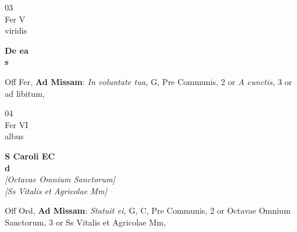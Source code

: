 \documentclass[10pt, openany]{book}
\begin{document}
        \begin{center}
            \begin{minipage}{3.5in}
                \vspace{2em}
                \begin{minipage}{0.5in}
                    {\Huge 03} \\
                    {\normalsize Fer V} \\
                    {\normalsize viridis}
                \end{minipage}
                \begin{minipage}{3.0in}
                    \textbf{ \large De ea \\
                    \textnormal{\normalsize s}} \\ 
                \end{minipage}
                \begin{justify}Off Fer, \textbf{Ad Missam}: \textit{In voluntate tua,} G, Pre Communis, 2 or \textit{A cunctis,} 3 or ad libitum,  
                \end{justify}
            \end{minipage}
        \end{center}
    
        \begin{center}
            \begin{minipage}{3.5in}
                \vspace{2em}
                \begin{minipage}{0.5in}
                    {\Huge 04} \\
                    {\normalsize Fer VI} \\
                    {\normalsize albus}
                \end{minipage}
                \begin{minipage}{3.0in}
                    \textbf{ \large S Caroli EC \\
                    \textnormal{\normalsize d}} \\ \textit{[Octavae Omnium Sanctorum]} \\ \textit{[Ss Vitalis et Agricolae Mm]} \\ 
                \end{minipage}
                \begin{justify}Off Ord, \textbf{Ad Missam}: \textit{Statuit ei,} G, C, Pre Communis, 2 or Octavae Omnium Sanctorum, 3 or Ss Vitalis et Agricolae Mm,  
                \end{justify}
            \end{minipage}
        \end{center}
    
\end{document}
